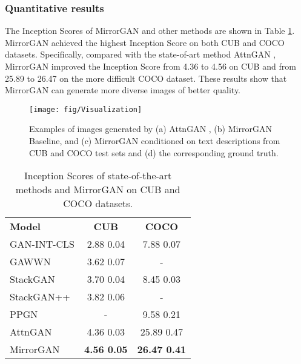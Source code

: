 \documentclass[10pt,twocolumn,letterpaper]{article}
\begin{document}
\subsubsection{Quantitative results}\label{InceptionScore}
The Inception Scores of MirrorGAN and other methods are shown in Table \ref{tab:InceptionScore}. MirrorGAN achieved the highest Inception Score on both CUB and COCO datasets. Specifically, compared with the state-of-art method AttnGAN \cite{xu2017attngan}, MirrorGAN improved the Inception Score from 4.36 to 4.56 on CUB and from 25.89 to 26.47 on the more difficult COCO dataset. These results show that MirrorGAN can generate more diverse images of better quality.
\begin{figure*}[tb!]
\centering
\noindent\texttt{[image: fig/Visualization]}
\protect\caption{Examples of images generated by (a) AttnGAN \cite{xu2017attngan}, (b) MirrorGAN Baseline, and (c) MirrorGAN conditioned on text descriptions from CUB and COCO test sets and (d) the corresponding ground truth.}
\label{fig:Visualization}
\end{figure*}

\begin{table}[htbp]
\centering
\fontsize{7.5}{9}\selectfont
\caption{\label{tab:InceptionScore}Inception Scores of state-of-the-art methods and MirrorGAN on CUB and COCO datasets.}
\begin{tabular}{lcc}
\toprule
\textbf{Model} & \textbf{CUB}& \textbf{COCO}\\
\cmidrule{1-3}
GAN-INT-CLS \cite{reed2016generative}                                                                        & {2.88  0.04}         & {7.88  0.07}       \\
GAWWN \cite{reed2016learning}                                                                                     & {3.62  0.07}        & {-}                                 \\
StackGAN \cite{zhang2017stackgan}                                                                               & {3.70  0.04}       & {8.45  0.03}      \\
StackGAN++ \cite{zhang2017stackgan++}                                                                      & {3.82  0.06}       & {-}                                 \\
PPGN \cite{nguyen2017plug}                                                                                             & {-}                                  & {9.58  0.21}       \\
AttnGAN \cite{xu2017attngan}                                                                                            & {4.36  0.03}        & {25.89  0.47}     \\
\midrule
MirrorGAN                                                                                                                        &  \textbf{4.56  0.05}          &  \textbf{26.47  0.41}     \\
\bottomrule
\end{tabular}
\end{table}
\end{document}
